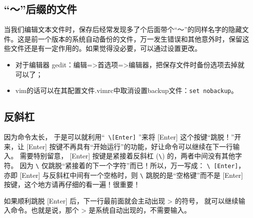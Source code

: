 \subsection{``～''后缀的文件}
当我们编辑文本文件时，保存后经常发现多了个后面带个``～''的同样名字的隐藏文件。这是前一个版本的系统自动备份的文件，万一发生错误和其他意外时，保留这些文件还是有一定作用的。如果觉得没必要，可以通过设置更改。

\begin{itemize}
\item
对于编辑器 gedit：编辑=>首选项=>编辑器，把保存文件时备份选项去掉就可以了；

\item
vim的话可以在其配置文件.vimrc中取消设置backup文件：\verb|set nobackup|。
\end{itemize}

\subsection{反斜杠}
因为命令太长， 于是可以就利用“\verb| \[Enter]| ”来将 [Enter] 这个按键“跳脱！”开来，让 [Enter] 按键不再具有“开始运行”的功能，好让命令可以继续在下一行输入。 需要特别留意， [Enter] 按键是紧接着反斜杠 (\verb|\|) 的，两者中间没有其他字符。 因为 \verb|\| 仅跳脱“紧接着的下一个字符”而已！所以，万一写成： \verb*|\ [Enter]|，亦即 [Enter] 与反斜杠中间有一个空格时，则 \verb|\| 跳脱的是“空格键”而不是 [Enter] 按键，这个地方请再仔细的看一遍！很重要！

如果顺利跳脱 [Enter] 后，下一行最前面就会主动出现 > 的符号， 就可以继续输入命令。也就是说，那个 > 是系统自动出现的，不需要输入。









